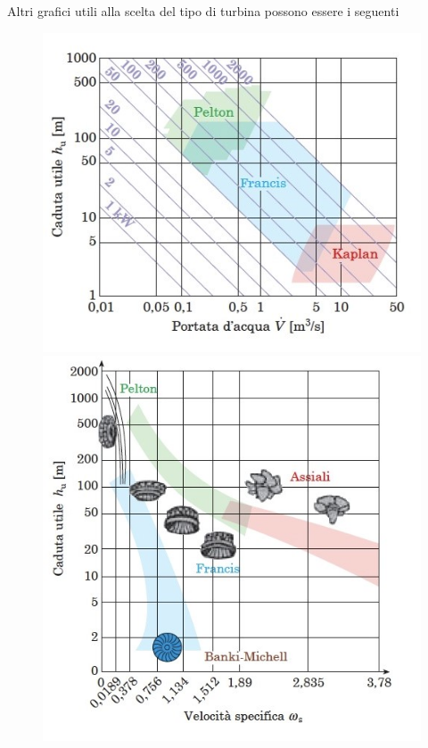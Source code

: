 \documentclass[a4paper, 15pt]{article}
\begin{document}
\begin{adjustwidth}{2in}{}
	Altri grafici utili alla scelta del tipo di turbina possono essere i seguenti
\begin{figure}[H]
	\centering
	\includegraphics[width=0.4\linewidth]{immagini/dim1}
	\label{fig:dim1}
	\includegraphics[width=0.4\linewidth]{immagini/dim4}
	\label{fig:dim4}
\end{figure} 
\end{adjustwidth}
\end{document}
